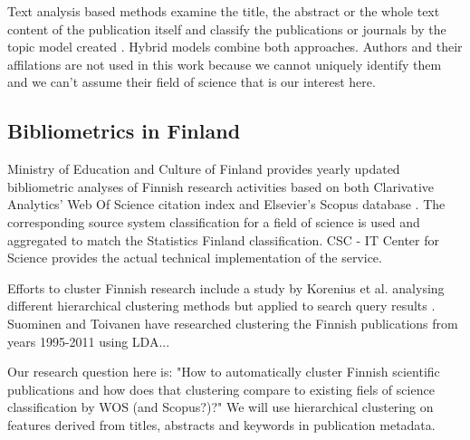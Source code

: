 Text analysis based methods examine the title, the abstract or 
the whole text content of the publication itself and classify 
the publications or journals by the topic model created 
\cite{blei_latent_2003}.
Hybrid models combine both approaches. Authors and their
affilations are not used in this work because we cannot uniquely
identify them and we can't assume their field of science that is
our interest here.





\subsection{Bibliometrics in Finland}
Ministry of Education and Culture of Finland provides yearly 
updated bibliometric analyses of Finnish research activities 
based on both Clarivative Analytics' Web Of Science citation 
index \cite[Vipunen service]{noauthor_ministry_2019} 
and Elsevier's Scopus database \cite[Vipunen 
service]{noauthor_ministry_2019-1}. The corresponding source 
system classification for a field of science is used and
aggregated to match the Statistics Finland classification. CSC - 
IT Center for Science provides the actual technical implementation 
of the service. 

Efforts to cluster Finnish research include a study by Korenius 
et al. analysing different hierarchical clustering methods but
applied to search query results \cite{korenius_hierarchical_2006}.
Suominen and Toivanen have researched clustering the Finnish
publications from years 1995-2011 using LDA... 
\cite{suominen_map_2016}  

Our research question here is: "How to automatically cluster 
Finnish
scientific publications and how does that clustering compare to
existing fiels of science classification by WOS (and Scopus?)?" We
 will use hierarchical clustering on features derived from titles,
  abstracts and keywords in publication metadata.



